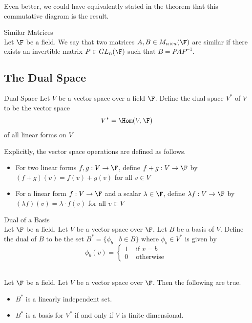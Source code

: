 \documentclass[a4paper]{article}
\begin{document}
Even better, we could have equivalently stated in the theorem that this commutative diagram is the result. 

\begin{defn}{Similar Matrices}{}\\
Let $\F$ be a field. We say that two matrices $A,B\in M_{n\times n}(\F)$ are similar if there exists an invertible matrix $P\in GL_n(\F)$ such that $B=PAP^{-1}$. 
\end{defn}

\subsection{The Dual Space}
\begin{defn}{Dual Space}{} Let $V$ be a vector space over a field $\F$. Define the dual space $V^\ast$ of $V$ to be the vector space $$V^\ast=\Hom(V,\F)$$ of all linear forms on $V$
\end{defn}

Explicitly, the vector space operations are defined as follows. 
\begin{itemize}
\item For two linear forms $f,g:V\to\F$, define $f+g:V\to\F$ by $(f+g)(v)=f(v)+g(v)$ for all $v\in V$
\item For a linear form $f:V\to\F$ and a scalar $\lambda\in\F$, define $\lambda f:V\to\F$ by $(\lambda f)(v)=\lambda\cdot f(v)$ for all $v\in V$
\end{itemize}

\begin{defn}{Dual of a Basis}{}\\
Let $\F$ be a field. Let $V$ be a vector space over $\F$. Let $B$ be a basis of $V$. Define the dual of $B$ to be the set $B^\ast=\{\phi_b\;|\;b\in B\}$ where $\phi_b\in V^\ast$ is given by $$\phi_b(v)=\begin{cases}
1 & \text{ if }v=b\\
0 & \text{ otherwise }
\end{cases}$$
\end{defn}

\begin{prp}{}{}\\
Let $\F$ be a field. Let $V$ be a vector space over $\F$. Then the following are true. 
\begin{itemize}
\item $B^\ast$ is a linearly independent set. 
\item $B^\ast$ is a basis for $V^\ast$ if and only if $V$ is finite dimensional. 
\end{itemize}
\end{prp}
\end{document}
